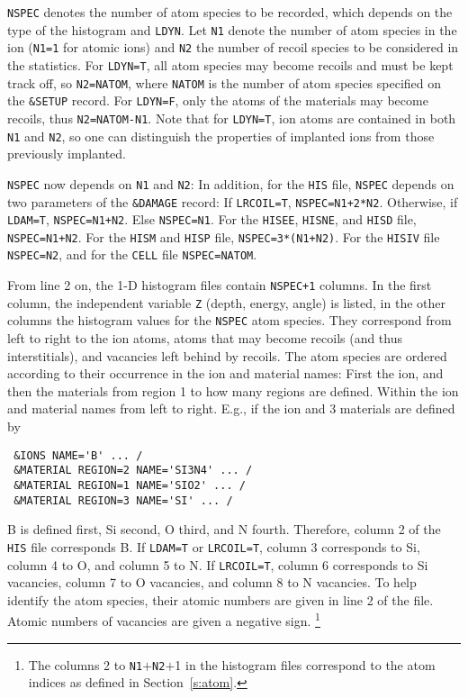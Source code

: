 \texttt{NSPEC} denotes the number of atom species to be recorded, which depends
on the type of the histogram and \texttt{LDYN}. Let \texttt{N1} denote the
number of atom species in the ion (\texttt{N1=1} for atomic ions) and
\texttt{N2} the number of recoil species to be considered in the statistics. For
\texttt{LDYN=T}, all atom species may become recoils and must be kept track off,
so \texttt{N2=NATOM}, where \texttt{NATOM} is the number of atom species
specified on the \texttt{\&SETUP} record. For \texttt{LDYN=F}, only the atoms of
the materials may become recoils, thus \texttt{N2=NATOM-N1}. Note that for
\texttt{LDYN=T}, ion atoms are contained in both \texttt{N1} and \texttt{N2}, so
one can distinguish the properties of implanted ions from those previously
implanted. 

\texttt{NSPEC} now depends on \texttt{N1} and \texttt{N2}: In addition, for the
\texttt{HIS} file, \texttt{NSPEC} depends on two parameters of the
\texttt{\&DAMAGE} record: If \texttt{LRCOIL=T}, \texttt{NSPEC=N1+2*N2}.
Otherwise, if \texttt{LDAM=T}, \texttt{NSPEC=N1+N2}. Else \texttt{NSPEC=N1}. For
the \texttt{HISEE}, \texttt{HISNE}, and \texttt{HISD} file,
\texttt{NSPEC=N1+N2}. For the \texttt{HISM} and \texttt{HISP} file,
\texttt{NSPEC=3*(N1+N2)}. For the \texttt{HISIV} file \texttt{NSPEC=N2}, and for
the \texttt{CELL} file \texttt{NSPEC=NATOM}.

From line 2 on, the 1-D histogram files contain \texttt{NSPEC+1} columns. In
the first column, the independent variable \texttt{Z} (depth, energy, angle) is 
listed, in the other columns the histogram values for the \texttt{NSPEC} atom
species. They correspond from left to right to the ion atoms, atoms that may
become recoils (and thus interstitials), and vacancies left behind by recoils.
The atom species are ordered according to their occurrence in the ion and
material names: First the ion, and then the materials from region 1 to how many
regions are defined. Within the ion and material names from left to right. 
E.g., if the ion and 3 materials are defined by 
%
\begin{verbatim}
 &IONS NAME='B' ... /
 &MATERIAL REGION=2 NAME='SI3N4' ... /
 &MATERIAL REGION=1 NAME='SIO2' ... /
 &MATERIAL REGION=3 NAME='SI' ... /
\end{verbatim}
%
B is defined first, Si second, O third, and N fourth. Therefore, column 2 of the
\texttt{HIS} file corresponds B. If \texttt{LDAM=T} or \texttt{LRCOIL=T}, column
3 corresponds to Si, column 4 to O, and column 5 to N. If \texttt{LRCOIL=T},
column 6 corresponds to Si vacancies, column 7 to O vacancies, and column 8 to N
vacancies. To help identify the atom species, their atomic numbers are given in
line 2 of the file. Atomic numbers of vacancies are given a negative sign.%
\footnote{The columns 2 to \texttt{N1}$+$\texttt{N2}$+$1 in the histogram files
correspond to the atom indices as defined in Section~\ref{s:atom}.}


